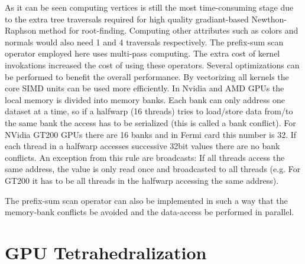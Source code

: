 As it can be seen computing vertices is still the most time-consuming stage due to the extra tree traversals required for high quality 
gradiant-based Newthon-Raphson method for root-finding. Computing other attributes such as colors and normals would also need 1 and 4 
traversals respectively. The prefix-sum scan operator employed here uses multi-pass computing. The extra cost of kernel invokations
increased the cost of using these operators. Several optimizations can be performed to benefit the overall performance. By 
vectorizing all kernels the core SIMD units can be used more efficiently. 
In Nvidia and AMD GPUs the local memory is divided into memory banks. Each bank can only address one dataset at a time, so if a halfwarp (16 threads)
tries to load/store data from/to the same bank the access has to be serialized (this is called a bank conflict). 
For NVidia GT200 GPUs there are 16 banks and in Fermi card this number is 32. If each thread in a halfwarp accesses successive 32bit values
there are no bank conflicts. An exception from this rule are broadcasts: If all threads access the same address, the value is only read once and
broadcasted to all threads (e.g. For GT200 it has to be all threads in the halfwarp accessing the same address).

The prefix-sum scan operator can also be implemented in such a way that the memory-bank conflicts be avoided and the data-access
be performed in parallel.


\section{GPU Tetrahedralization}



















